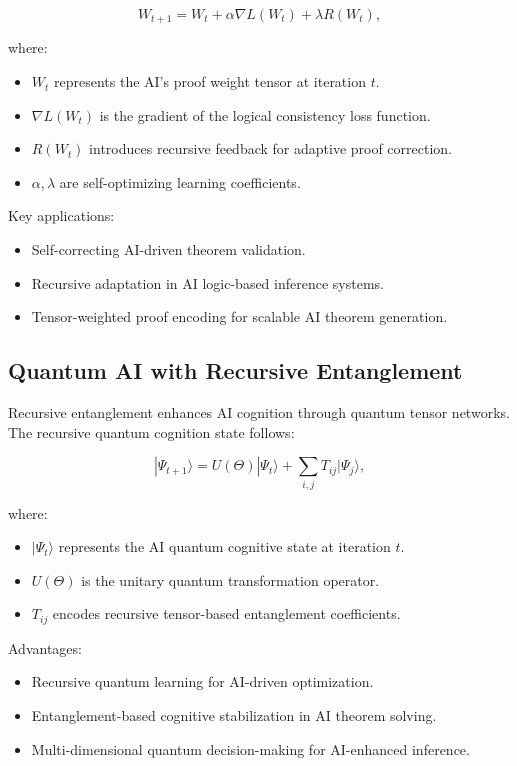 \documentclass{article}
\theoremstyle{plain}
\begin{document}
\begin{equation}
W_{t+1} = W_t + \alpha \nabla L(W_t) + \lambda R(W_t),
\end{equation}

where:
\begin{itemize}
    \item $W_t$ represents the AI's proof weight tensor at iteration $t$.
    \item $\nabla L(W_t)$ is the gradient of the logical consistency loss function.
    \item $R(W_t)$ introduces recursive feedback for adaptive proof correction.
    \item $\alpha, \lambda$ are self-optimizing learning coefficients.
\end{itemize}

Key applications:
\begin{itemize}
    \item Self-correcting AI-driven theorem validation.
    \item Recursive adaptation in AI logic-based inference systems.
    \item Tensor-weighted proof encoding for scalable AI theorem generation.
\end{itemize}

\subsection{Quantum AI with Recursive Entanglement}

Recursive entanglement enhances AI cognition through quantum tensor networks. The recursive quantum cognition state follows:

\begin{equation}
|\Psi_{t+1}\rangle = U(\Theta) |\Psi_t\rangle + \sum_{i,j} T_{ij} |\Psi_j\rangle,
\end{equation}

where:
\begin{itemize}
    \item $|\Psi_t\rangle$ represents the AI quantum cognitive state at iteration $t$.
    \item $U(\Theta)$ is the unitary quantum transformation operator.
    \item $T_{ij}$ encodes recursive tensor-based entanglement coefficients.
\end{itemize}

Advantages:
\begin{itemize}
    \item Recursive quantum learning for AI-driven optimization.
    \item Entanglement-based cognitive stabilization in AI theorem solving.
    \item Multi-dimensional quantum decision-making for AI-enhanced inference.
\end{itemize}
\end{document}
